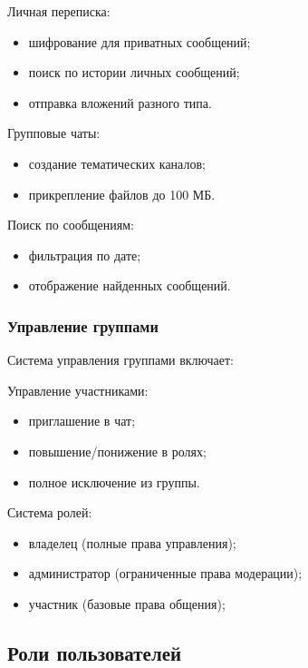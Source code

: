 Личная переписка:

	\begin{itemize}
		\item шифрование для приватных сообщений;
		\item поиск по истории личных сообщений;
		\item отправка вложений разного типа.
	\end{itemize}
	
Групповые чаты:

	\begin{itemize}
		\item создание тематических каналов;
		\item прикрепление файлов до 100 МБ.
	\end{itemize}
	
Поиск по сообщениям:

	\begin{itemize}
		\item фильтрация по дате;
		\item отображение найденных сообщений.
	\end{itemize}
	
\subsubsection{Управление группами}

Система управления группами включает:
	
Управление участниками:

	\begin{itemize}
		\item приглашение в чат;
		\item повышение/понижение в ролях;
		\item полное исключение из группы.
	\end{itemize}
	
Система ролей:

	\begin{itemize}
		\item владелец (полные права управления);
		\item администратор (ограниченные права модерации);
		\item участник (базовые права общения);
	\end{itemize}
	

\subsection{Роли пользователей}

